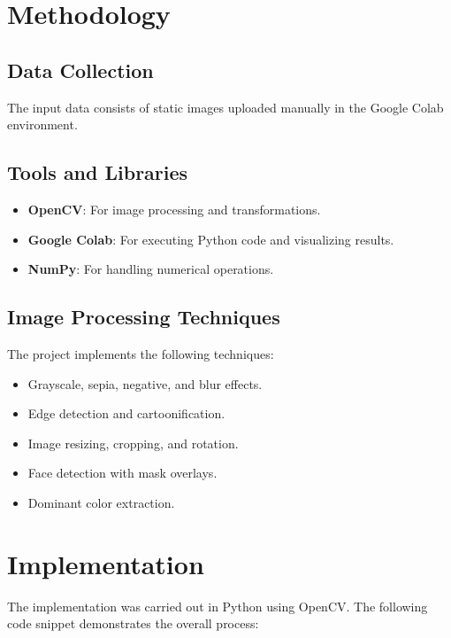 \documentclass{report}
\begin{document}
\section{Methodology}
\subsection{Data Collection}
The input data consists of static images uploaded manually in the Google Colab environment. 

\subsection{Tools and Libraries}
\begin{itemize}
    \item \textbf{OpenCV}: For image processing and transformations.
    \item \textbf{Google Colab}: For executing Python code and visualizing results.
    \item \textbf{NumPy}: For handling numerical operations.
\end{itemize}

\subsection{Image Processing Techniques}
The project implements the following techniques:
\begin{itemize}
    \item Grayscale, sepia, negative, and blur effects.
    \item Edge detection and cartoonification.
    \item Image resizing, cropping, and rotation.
    \item Face detection with mask overlays.
    \item Dominant color extraction.
\end{itemize}

\section{Implementation}
The implementation was carried out in Python using OpenCV. The following code snippet demonstrates the overall process:
\end{document}
